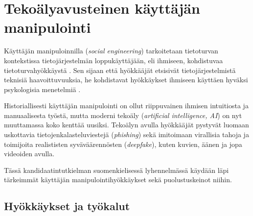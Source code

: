


\chapter*{Tekoälyavusteinen käyttäjän\\manipulointi\label{chapter:finnish}}
\begin{comment}

Tekoälyä hyödyntävä käyttäjän manipulointi
Teokälypohjainen käyttäjän manipulointi
Tekoälyavusteinen käyttäjän manipulointi

Pyydä Riinalta ym palautetta kieliopin tarkistuksessa! Opin samalla itse. Riinahan voi tarkistaa esim tätä .tex tiedostoa GitHubista? Tai PDF kumpi vaan hänelle parempi, mutta PDF:n kassa pitää muistaa aina päivittää se Overleafiin ja sitten GitHubiin.

Ohjeet:
    - 4 or 5 sivua
    - TOC ja Chapter 1 Introduction väliin

Kappaleet:
    - (ilman nimeä sisältää Introduction ja Definition kappaleet)
    - Hyökkäykset ja työkalut
    - Puolustuskeinot
    - Puolustuskeinojen arviointia
    - Yhteenveto
    - EI Overleaf kappalenumerointia? Kappale "0"?
    

\end{comment}


Käyttäjän manipuloinnilla (\textit{social engineering}) tarkoitetaan tietoturvan kontekstissa tietojärjestelmän loppukäyttäjään, eli ihmiseen, kohdistuvaa tietoturvahyökkäystä \citep{mitnickArtDeceptionControlling2003}. Sen sijaan että hyökkääjät etsisivät tietojärjestelmistä teknisiä haavoittuvuuksia, he kohdistavat hyökkäykset ihmiseen käyttäen hyväksi psykologisia menetelmiä \citep{wangDefiningSocialEngineering2020}.

Historiallisesti käyttäjän manipulointi on ollut riippuvainen ihmisen intuitiosta ja manuaalisesta työstä, mutta moderni tekoäly (\textit{artificial intelligence, AI}) on nyt muuttamassa koko kenttää uusiksi. Tekoälyn avulla hyökkääjät pystyvät luomaan uskottavia tietojenkalasteluviestejä (\textit{phishing}) sekä imitoimaan virallisia tahoja ja toimijoita realististen syväväärennösten (\textit{deepfake}), kuten kuvien, äänen ja jopa videoiden avulla.

Tässä kandidaatintutkielman suomenkielisessä lyhennelmässä käydään läpi tärkeimmät käyttäjän manipulointihyökkäykset sekä puolustuskeinot niihin.

\section*{Hyökkäykset ja työkalut}

